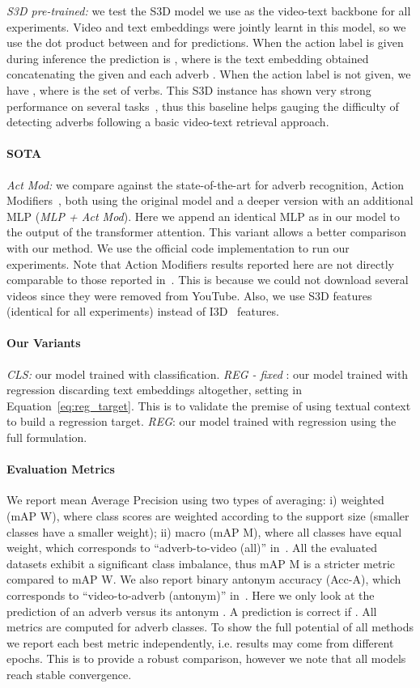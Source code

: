 \documentclass[10pt,twocolumn,letterpaper]{article}
\newcommand{\fparagraph}[1]{\paragraph{#1}}
\begin{document}
\textit{S3D pre-trained:} we test the S3D model we use as the video-text backbone 
for all experiments. 
Video and text embeddings were jointly learnt in this model, so we use the dot product between  and  for predictions. When the action label  is given during inference the prediction is , where  is the text embedding obtained concatenating the given  and each adverb . When the action label is not given, we have , where  is the set of verbs. This S3D instance has shown very strong performance on several tasks~\cite{miech19endtoend}, thus this baseline helps gauging 
the difficulty of detecting adverbs following a basic video-text retrieval approach.

\vspace{-12pt}

\fparagraph{SOTA}\textit{Act Mod:} we compare against the state-of-the-art for adverb recognition, Action Modifiers~\cite{doughty2020action}, 
both using the original model and a deeper version with an additional MLP (\textit{MLP + Act Mod}). Here we append an identical MLP as in our model to the output of the transformer attention. This variant allows a better comparison with our method. 
We use the official code implementation to run our experiments. Note that Action Modifiers results reported here are not directly comparable to those reported in~\cite{doughty2020action, doughty2022you}. This is because we could not download several videos since they were removed from YouTube. Also, we use 
S3D features (identical for all experiments) instead of I3D~\cite{carreira2017quo} features. 

\vspace{-13pt}

\fparagraph{Our Variants}\textit{CLS:} our model trained with classification. \textit{REG - fixed }: our model trained with regression discarding text embeddings altogether, setting  in Equation~\ref{eq:reg_target}. This is to validate the premise of using textual context to build a regression target.
\textit{REG}: our model trained with regression using the full formulation.

\vspace{-13pt}

\fparagraph{Evaluation Metrics}
We report mean Average Precision using two types of averaging: i) weighted (mAP W), where class scores are weighted according to the support size (smaller classes have a smaller weight); ii) macro (mAP M), where all classes have equal weight, which corresponds to ``adverb-to-video (all)'' in~\cite{doughty2020action}. All the evaluated datasets exhibit a significant class imbalance, thus mAP M is a stricter metric compared to mAP W. 
We also report binary antonym accuracy (Acc-A), which corresponds to ``video-to-adverb (antonym)'' in~\cite{doughty2020action}. Here we only look at the prediction of an adverb  versus its antonym . A prediction  is correct if . All metrics are computed for adverb classes.
To show the full potential of all methods we report each best metric independently, i.e. results may come from different epochs. 
This is to provide a robust comparison, however we note that all models reach stable convergence. 
\end{document}
